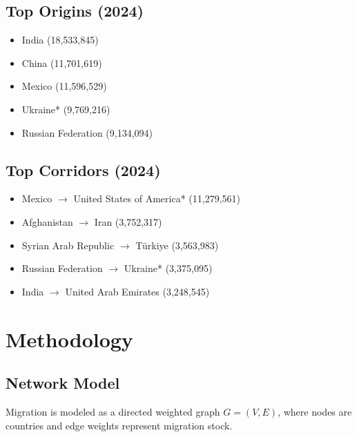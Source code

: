\documentclass[12pt]{report}
\begin{document}
\section{Top Origins (2024)}
\begin{itemize}
    \item India (18,533,845)
    \item China (11,701,619)
    \item Mexico (11,596,529)
    \item Ukraine* (9,769,216)
    \item Russian Federation (9,134,094)
\end{itemize}

\section{Top Corridors (2024)}
\begin{itemize}
    \item Mexico $\rightarrow$ United States of America* (11,279,561)
    \item Afghanistan $\rightarrow$ Iran (3,752,317)
    \item Syrian Arab Republic $\rightarrow$ T\"urkiye (3,563,983)
    \item Russian Federation $\rightarrow$ Ukraine* (3,375,095)
    \item India $\rightarrow$ United Arab Emirates (3,248,545)
\end{itemize}

\chapter{Methodology}
\section{Network Model}
Migration is modeled as a directed weighted graph $G=(V,E)$, where nodes are countries and edge weights represent migration stock.
\end{document}
